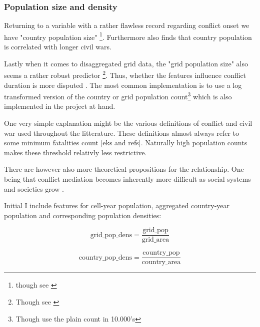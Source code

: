 \documentclass[a4paper]{article}
\begin{document}
\subsubsection{Population size and density} 

Returning to a variable with a rather flawless record regarding conflict onset we have "country population size" \citep{Collier_Hoeffler_1998, Fearon_Laitin_2003, Collier_Hoeffler_2004, Hegre_Sambanis_2006}\footnote{though see \cite{Goldstone_2010}}. Furthermore \cite[287]{Fearon_2004} also finds that country population is correlated with longer civil wars.\par

Lastly when it comes to disaggregated grid data, the "grid population size" also seems a rather robust predictor \citep{Buhaug_2010, Cederman_Gleditsch_Buhaug_2013}\footnote{Though see \cite{Hegre_Oestby_Raleigh_2009}}. Thus, whether the features influence conflict duration is more disputed \citep{Collier_Hoeffler_1998, Fearon_2004}. The most common implementation is to use a log transformed version of the country or grid population count\footnote{Though \cite{Collier_Hoeffler_1998} use the plain count in 10.000's} which is also implemented in the project at hand.\par


One very simple explanation might be the various definitions of conflict and civil war used throughout the litterature. These definitions almost always refer to some minimum fatalities count [eks and refs]. Naturally high population counts makes these threshold relativly less restrictive.\par

There are however also more theoretical propositions for the relationship. One being that conflict mediation becomes inherently more difficult as social systems and societies grow \cite[p- 271-272]{Diamond_1998}.\par

Initial I include features for cell-year population, aggregated country-year population and corresponding population densities:

$$\textrm{grid\_pop\_dens} = \frac{\textrm{grid\_pop}}{\textrm{grid\_area}}$$

$$\textrm{country\_pop\_dens} = \frac{\textrm{country\_pop}}{\textrm{country\_area}}$$
\end{document}
